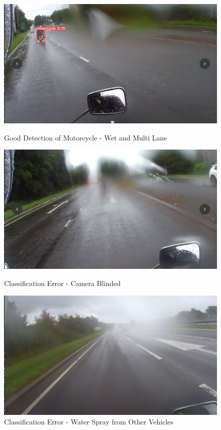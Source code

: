 \documentclass[conference]{IEEEtran}
\begin{document}
	\begin{figure}[h]
		\centering
		\begin{minipage}{0.15\textwidth}
			\centering
			\includegraphics[width=\linewidth]{Figures/wet_correct.png}
			\caption{Good Detection of Motorcycle - Wet and Multi Lane}
			\label{fig:detectionOfMotorcycleW1}
		\end{minipage}\hfill
		\begin{minipage}{0.15\textwidth}
			\centering
			\includegraphics[width=\linewidth]{Figures/wet_incorrect.png}
			\caption{Classification Error - Camera Blinded}
			\label{fig:detectionOfMotorcycleW2}
		\end{minipage}\hfill
		\begin{minipage}{0.15\textwidth}
			\centering
			\includegraphics[width=\linewidth]{Figures/wet_danger.png}
			\caption{Classification Error - Water Spray from Other Vehicles}
			\label{fig:detectionOfMotorcycleW3}
		\end{minipage}
	\end{figure}	
\end{document}
